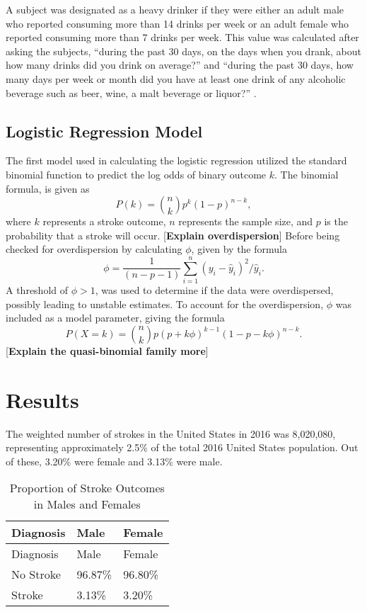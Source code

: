 \documentclass[11pt,]{article}
\begin{document}
A subject was designated as a heavy drinker if they were either an adult
male who reported consuming more than 14 drinks per week or an adult
female who reported consuming more than 7 drinks per week. This value
was calculated after asking the subjects, ``during the past 30 days, on
the days when you drank, about how many drinks did you drink on
average?'' and ``during the past 30 days, how many days per week or
month did you have at least one drink of any alcoholic beverage such as
beer, wine, a malt beverage or liquor?''
\citep{CentersforDiseaseControlandPrevention2007}.

\hypertarget{logistic-regression-model}{%
\subsection{Logistic Regression Model}\label{logistic-regression-model}}

The first model used in calculating the logistic regression utilized the
standard binomial function to predict the log odds of binary outcome
\(k\). The binomial formula, is given as
\[P(k)={n \choose k}p^{k}(1-p)^{n-k},\] where \(k\) represents a stroke
outcome, \(n\) represents the sample size, and \(p\) is the probability
that a stroke will occur. {[}\textbf{Explain overdispersion}{]} Before
being checked for overdispersion by calculating \(\phi\), given by the
formula
\[\phi = \frac{1}{(n-p-1)}\sum_{i=1}^{n} (y_{i} -\hat{y} _{i})^{2} 
/ \hat{y} _{i}.\] A threshold of \(\phi > 1\), was used to determine if
the data were overdispersed, possibly leading to unstable estimates. To
account for the overdispersion, \(\phi\) was included as a model
parameter, giving the formula
\[P(X=k)={n \choose k}p(p+k\phi)^{k-1}(1-p-k\phi)^{n-k}.\]
{[}\textbf{Explain the quasi-binomial family more}{]}

\hypertarget{results}{%
\section{Results}\label{results}}

The weighted number of strokes in the United States in 2016 was
8,020,080, representing approximately 2.5\% of the total 2016 United
States population. Out of these, 3.20\% were female and 3.13\% were
male.

\begin{longtable}[]{@{}lll@{}}
\caption{Proportion of Stroke Outcomes in Males and
Females}\tabularnewline
\toprule
Diagnosis & Male & Female\tabularnewline
\midrule
\endfirsthead
\toprule
Diagnosis & Male & Female\tabularnewline
\midrule
\endhead
No Stroke & 96.87\% & 96.80\%\tabularnewline
Stroke & 3.13\% & 3.20\%\tabularnewline
\bottomrule
\end{longtable}
\end{document}
